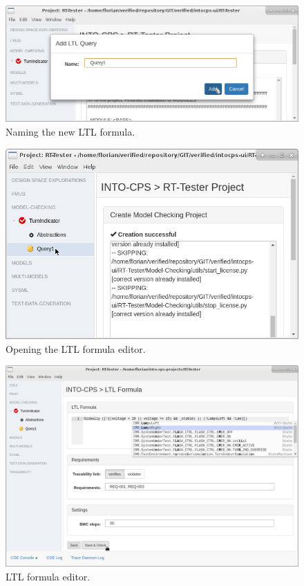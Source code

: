 %
%
%
\begin{figure}[ht]
    \centerline{\includegraphics[scale=0.4]{figures/VSI-MC_Add-LTL-Dialog}}
    \caption{Naming the new LTL formula.}
    \label{figure:INTO-CPS-App:Add-LTL-Dialog}
\end{figure}
%
%
%
\begin{figure}[ht]
    \centerline{\includegraphics[scale=0.4]{figures/VSI-MC_Open-LTL}}
    \caption{Opening the LTL formula editor.}
    \label{figure:INTO-CPS-App:Open-LTL}
\end{figure}
%
%
%
\begin{figure}[ht]
    \centerline{\includegraphics[width=\textwidth]{figures/VSI-MC_Edit-LTL-Completion}}
    \caption{LTL formula editor.}
    \label{figure:INTO-CPS-App:Edit-LTL-Completion}
\end{figure}
